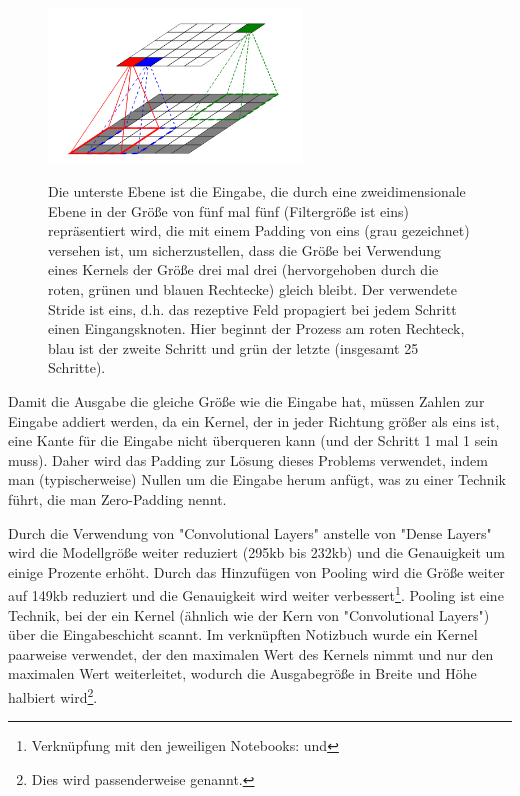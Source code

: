 \begin{figure}
    \centering
    \caption[Konvolutionelle Ebene]{  Die unterste Ebene ist die Eingabe, die durch eine zweidimensionale Ebene in der Größe von fünf mal fünf (Filtergröße ist eins) repräsentiert wird, die mit einem Padding von eins (grau gezeichnet) versehen ist, um sicherzustellen, dass die Größe bei Verwendung eines Kernels der Größe drei mal drei (hervorgehoben durch die roten, grünen und blauen Rechtecke) gleich bleibt. Der verwendete Stride ist eins, d.h. das rezeptive Feld propagiert bei jedem Schritt einen Eingangsknoten. Hier beginnt der Prozess am roten Rechteck, blau ist der zweite Schritt und grün der letzte (insgesamt 25 Schritte). }
    \includegraphics[width=0.6\textwidth]{images/conv_layer.png}
    \label{fig:conv_layer}
\end{figure}

Damit die Ausgabe die gleiche Größe wie die Eingabe hat, müssen Zahlen zur Eingabe addiert werden, da ein Kernel, der in jeder Richtung größer als eins ist, eine Kante für die Eingabe nicht überqueren kann (und der Schritt 1 mal 1 sein muss).
Daher wird das Padding zur Lösung dieses Problems verwendet, indem man (typischerweise) Nullen um die Eingabe herum anfügt, was zu einer Technik führt, die man Zero-Padding nennt.

Durch die Verwendung von "Convolutional Layers" anstelle von "Dense Layers" wird die Modellgröße weiter reduziert (295kb bis 232kb) und die Genauigkeit um einige Prozente erhöht. Durch das Hinzufügen von Pooling wird die Größe weiter auf 149kb reduziert und die Genauigkeit wird weiter verbessert\footnote{Verknüpfung mit den jeweiligen Notebooks:  und }.
Pooling ist eine Technik, bei der ein Kernel (ähnlich wie der Kern von "Convolutional Layers") über die Eingabeschicht scannt.
Im verknüpften Notizbuch wurde ein Kernel paarweise verwendet, der den maximalen Wert des Kernels nimmt und nur den maximalen Wert weiterleitet, wodurch die Ausgabegröße in Breite und Höhe halbiert wird\footnote{Dies wird passenderweise  genannt.}.

